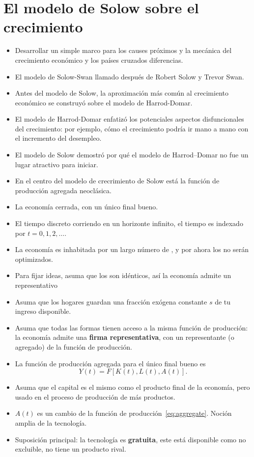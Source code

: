\section{El modelo de Solow sobre el crecimiento}

\begin{itemize}
	\item Desarrollar un simple marco para los causes próximos y la mecánica del crecimiento económico y los países cruzados %
	diferencias.
	\item El modelo de Solow-Swan llamado después de Robert Solow y Trevor Swan.
	\item Antes del modelo de Solow, la aproximación más común al crecimiento económico se construyó sobre el modelo de Harrod-Domar.
	\item El modelo de Harrod-Domar enfatizó los potenciales aspectos disfuncionales del crecimiento: por ejemplo, cómo el crecimiento podría ir mano a mano con el incremento del desempleo.
	\item El modelo de Solow demostró por qué el modelo de Harrod--Domar no fue un lugar atractivo para iniciar.
	\item En el centro del modelo de crecrimiento de Solow está la función de producción agregada neoclásica.
\end{itemize}

\begin{itemize}
	\item La economía cerrada, con un único final bueno.
	\item El tiempo discreto corriendo en un horizonte infinito, el tiempo es indexado por $t=0,1,2,\ldots$.
	\item La economía es inhabitada por un largo número de %
	, y por ahora los %
	no serán optimizados.
	\item Para fijar ideas, asuma que los %
	son idénticos, así la economía admite un representativo %
	\item Asuma que los hogares guardan una fracción exógena constante $s$ de tu ingreso disponible.
	\item Asuma que todas las formas tienen acceso a la misma función de producción: la economía admite una \textbf{firma representativa}, con un representante (o agregado) de la función de producción.
	\item La función de producción agregada para el único final bueno es
	\begin{equation}\label{eq:aggregate}
	Y\left(t\right)=F\left[K\left(t\right),L\left(t\right),A\left(t\right)\right].
	\end{equation}
	\item Asuma que el capital es el mismo como el producto final de la economía, pero usado en el proceso de producción de más productos.
	\item $A\left(t\right)$ es un cambio de la función de producción~\eqref{eq:aggregate}. Noción amplia de la tecnología.
	\item Suposición principal: la tecnología es \textbf{gratuita}, este está disponible como no excluible, no tiene un producto rival.
\end{itemize}

